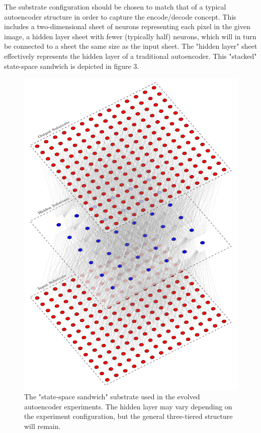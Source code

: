 \documentclass{acm_proc_article-sp}
\begin{document}
The substrate configuration should be chosen to match that of a typical autoencoder structure in order to capture the encode/decode concept.  This includes a two-dimensional sheet of neurons representing each pixel in the given image, a hidden layer sheet with fewer (typically half) neurons, which will in turn be connected to a sheet the same size as the input sheet.  The "hidden layer" sheet effectively represents the hidden layer of a traditional autoencoder.  This "stacked" state-space sandwich is depicted in figure 3.

\begin{figure}[h]
\caption{The "state-space sandwich" substrate used in the evolved autoencoder experiments.  The hidden layer may vary depending on the experiment configuration, but the general three-tiered structure will remain.}
\centering
\includegraphics[scale=0.55]{SubstrateConfiguration/AutoencoderSubstrate}
\end{figure}
\end{document}
